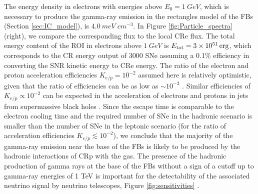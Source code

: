 The energy density in electrons with energies above $E_0 = \SI{1}{GeV}$, which is necessary to produce the gamma-ray emission
in the rectangles model of the FBs (Section \ref{sec:IC_model}), is $\SI{4.0}{meV\;cm^{-3}}$.
In Figure \ref{fig:Particle_spectra} (right), we compare the corresponding flux to the local CRe flux.
The total energy content of the ROI in electrons above $\SI{1}{GeV}$ is $E_{\text{tot}} = \SI{3e51}{erg}$, which corresponds to the CR energy output of 3000 SNe 
assuming a 0.1\% efficiency in converting the SNR kinetic energy to CRe energy.
The ratio of the electron and proton acceleration efficiencies $K_{e/p} = 10^{-2}$ assumed here is relatively optimistic,
given that the ratio of efficiencies can be as low as $\sim 10^{-3}$ \citep[e.g.,][]{2015PhRvL.114h5003P}.
Similar efficiencies of $K_{e/p} \propto 10^{-2}$ can be expected in the acceleration of 
electrons and protons in jets from supermassive black holes \citep[e.g.,][]{2018arXiv180305556B}.
Since the escape time is comparable to the electron cooling time and the required number of SNe in the hadronic
scenario is smaller than the number of SNe in the leptonic scenario (for the ratio of acceleration efficiencies $K_{e/p} \lesssim 10^{-2}$),
we conclude that the majority of the gamma-ray emission near the base of the FBs 
is likely to be produced by the hadronic interactions of CRp with the gas.
The presence of the hadronic production of gamma rays at the base of the FBs without a sign of a cutoff up to gamma-ray energies
of 1 TeV is important for the detectability of the associated neutrino signal by neutrino telescopes, Figure \ref{fig:sensitivities} \citep[see also][]{2018Galax...6...47R}.


